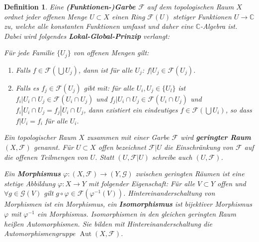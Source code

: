 \documentclass[12pt,a4paper]{article}
\theoremstyle{plain}
\newtheorem{Definition}[Theorem]{Definition}
\newcommand{\herv}[1]{{\emph{\textbf{#1}}}}
\newcommand{\C}{\mathbb{C}}
\numberwithin{equation}{section}
\begin{document}
\begin{Definition}Eine \herv{(Funktionen-)Garbe $\mathcal{F}$} auf dem topologischen Raum $X$ ordnet jeder offenen Menge $U\subset X$ einen Ring $\mathcal{F}(U)$ stetiger Funktionen $U\rightarrow \C$ zu, welche alle konstanten Funktionen umfasst und daher eine $\C$-Algebra ist. Dabei wird folgendes \herv{Lokal-Global-Prinzip} verlangt:

Für jede Familie $\{U_j\}$ von offenen Mengen gilt:
\begin{enumerate}
\item Falls $f\in \mathcal{F}(\bigcup U_j)$, dann ist für alle $U_j$: $f|U_j \in \mathcal{F}(U_j)$.
\item Falls es $f_j\in \mathcal{F}(U_j)$ gibt mit: für alle $U_i,U_j \in \{U_l\}$ ist $f_i|U_i\cap U_j \in \mathcal{F}(U_i\cap U_j)$ und $f_j|U_i\cap U_j \in \mathcal{F}(U_i\cap U_j)$ und $f_i|U_i\cap U_j = f_j|U_i\cap U_j$, dann existiert ein eindeutiges $f\in \mathcal{F}(\bigcup U_i)$, so dass $f|U_i = f_i$ für alle $U_i$.
\end{enumerate}
Ein topologischer Raum $X$ zusammen mit einer Garbe $\mathcal{F}$ wird \herv{geringter Raum} $(X,\mathcal{F})$ genannt. Für $U\subset X$ offen bezeichnet $\mathcal{F}|U$ die Einschränkung von $\mathcal{F}$ auf die offenen Teilmengen von $U$. Statt $(U,\mathcal{F}|U)$ schreibe auch $(U,\mathcal{F})$.

Ein \herv{Morphismus} $\varphi:(X,\mathcal{F})\rightarrow (Y,\mathcal{G})$ zwischen geringten Räumen ist eine stetige Abbildung $\varphi:X\rightarrow Y$ mit folgender Eigenschaft: Für alle $V\subset Y$ offen und $\forall g\in \mathcal{G}(V)$ gilt $g\circ\varphi \in \mathcal{F}(\varphi^{-1}(V))$. Hintereinanderschaltung von Morphismen ist ein Morphismus, ein \herv{Isomorphismus} ist bijektiver Morphismus $\varphi$ mit $\varphi^{-1}$ ein Morphismus. Isomorphismen in den gleichen geringten Raum heißen Automorphismen. Sie bilden mit Hintereinanderschaltung die Automorphismengruppe $\operatorname{Aut}(X,\mathcal{F})$.
\end{Definition}
\end{document}
